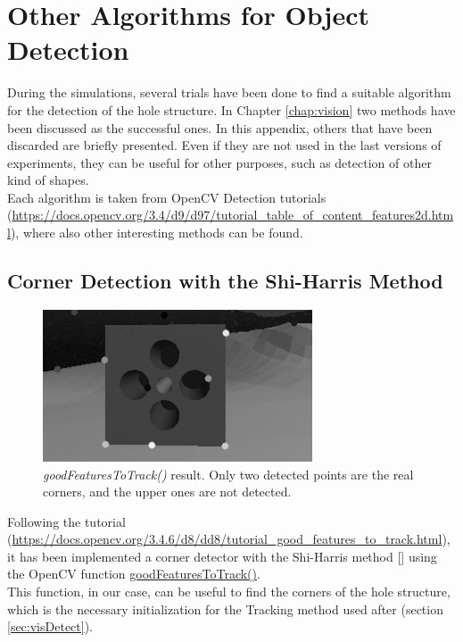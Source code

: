 

\chapter{Other Algorithms for Object Detection}
\label{chap:AppendixVision}
\ifpdf
    \graphicspath{{Vision/Figures/PNG/}{Vision/Figures/PDF/}{Vision/Figures/}}
\else
    \graphicspath{{Vision/Figures/EPS/}{Vision/Figures/}}
\fi

During the simulations, several trials have been done to find a suitable algorithm for the detection of the hole structure. In Chapter \ref{chap:vision} two methods have been discussed as the successful ones. In this appendix, others that have been discarded are briefly presented. Even if they are not used in the last versions of experiments, they can be useful for other purposes, such as detection of other kind of shapes.\\
Each algorithm is taken from OpenCV Detection tutorials (\url{https://docs.opencv.org/3.4/d9/d97/tutorial_table_of_content_features2d.html}), where also other interesting methods can be found.

\section{Corner Detection with the Shi-Harris Method}

\begin{figure}[H]
	\centering
	\includegraphics[width=8.0cm]{goodFeatToTrack}
	\caption[Result of \textit{goodFeaturesToTrack()}]{\textit{goodFeaturesToTrack()} result. Only two detected points are the real corners, and the upper ones are not detected.} 
	\label{fig:goodFeatToTrack}
\end{figure}


Following the tutorial (\url{https://docs.opencv.org/3.4.6/d8/dd8/tutorial_good_features_to_track.html}), it has been implemented a corner detector with the Shi-Harris method [\cite{Shi94goodfeatures}] using the OpenCV function \href{https://docs.opencv.org/3.4.6/dd/d1a/group__imgproc__feature.html#ga1d6bb77486c8f92d79c8793ad995d541}{goodFeaturesToTrack()}.\\
This function, in our case, can be useful to find the corners of the hole structure, which is the necessary initialization for the Tracking method used after (section \ref{sec:visDetect}).\\

